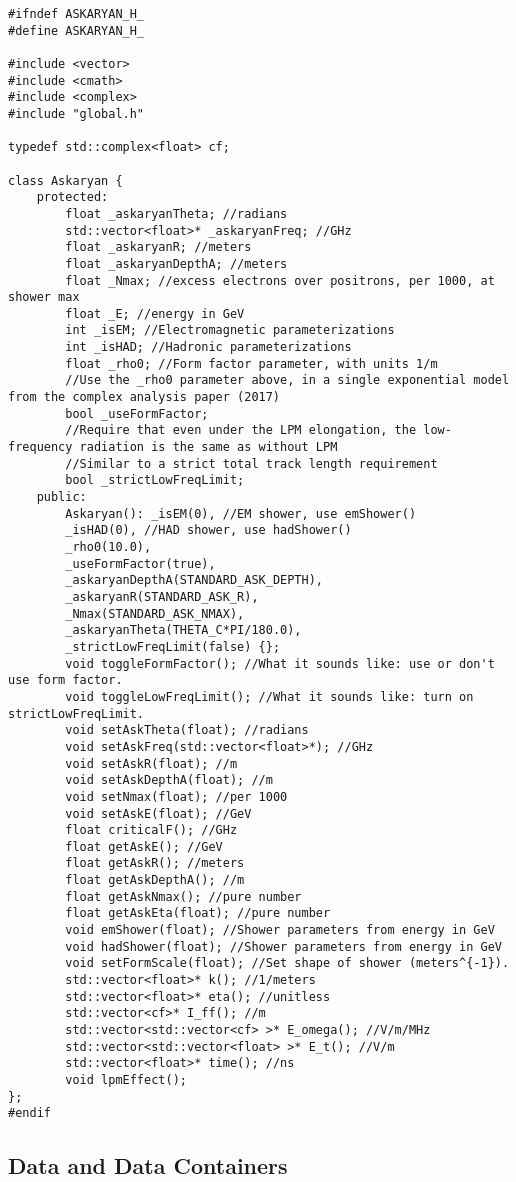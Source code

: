 \documentclass[10pt]{article}
\begin{document}
\begin{verbatim}
#ifndef ASKARYAN_H_
#define ASKARYAN_H_

#include <vector>
#include <cmath>
#include <complex>
#include "global.h"

typedef std::complex<float> cf;

class Askaryan {
	protected:
		float _askaryanTheta; //radians
		std::vector<float>* _askaryanFreq; //GHz
		float _askaryanR; //meters
		float _askaryanDepthA; //meters
		float _Nmax; //excess electrons over positrons, per 1000, at shower max
		float _E; //energy in GeV
		int _isEM; //Electromagnetic parameterizations
		int _isHAD; //Hadronic parameterizations
		float _rho0; //Form factor parameter, with units 1/m
		//Use the _rho0 parameter above, in a single exponential model from the complex analysis paper (2017)
		bool _useFormFactor;
		//Require that even under the LPM elongation, the low-frequency radiation is the same as without LPM
		//Similar to a strict total track length requirement
		bool _strictLowFreqLimit;
	public:
		Askaryan(): _isEM(0), //EM shower, use emShower()
		_isHAD(0), //HAD shower, use hadShower()
		_rho0(10.0),
		_useFormFactor(true),
		_askaryanDepthA(STANDARD_ASK_DEPTH),
		_askaryanR(STANDARD_ASK_R),
		_Nmax(STANDARD_ASK_NMAX),
		_askaryanTheta(THETA_C*PI/180.0),
		_strictLowFreqLimit(false) {};
		void toggleFormFactor(); //What it sounds like: use or don't use form factor.
		void toggleLowFreqLimit(); //What it sounds like: turn on strictLowFreqLimit.
		void setAskTheta(float); //radians
		void setAskFreq(std::vector<float>*); //GHz
		void setAskR(float); //m
		void setAskDepthA(float); //m
		void setNmax(float); //per 1000
		void setAskE(float); //GeV
		float criticalF(); //GHz
		float getAskE(); //GeV
		float getAskR(); //meters
		float getAskDepthA(); //m
		float getAskNmax(); //pure number
		float getAskEta(float); //pure number
		void emShower(float); //Shower parameters from energy in GeV
		void hadShower(float); //Shower parameters from energy in GeV
		void setFormScale(float); //Set shape of shower (meters^{-1}).
		std::vector<float>* k(); //1/meters
		std::vector<float>* eta(); //unitless
		std::vector<cf>* I_ff(); //m
		std::vector<std::vector<cf> >* E_omega(); //V/m/MHz
		std::vector<std::vector<float> >* E_t(); //V/m
		std::vector<float>* time(); //ns
		void lpmEffect();
};
#endif
\end{verbatim}

\subsection{Data and Data Containers}
\end{document}
